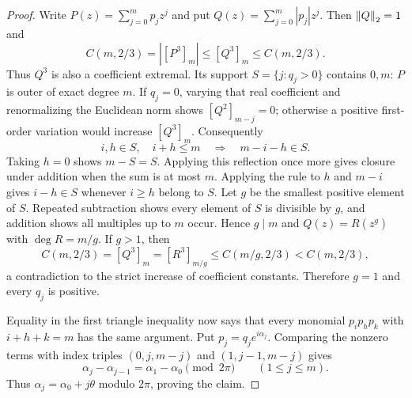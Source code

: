 \begin{proof}
Write $P(z)=\sum_{j=0}^m p_jz^j$ and put
$Q(z)=\sum_{j=0}^m|p_j|z^j$.  Then $\left\lVert Q\right\rVert_2=1$ and
\[
 C(m,2/3)=|[P^3]_m|\le[Q^3]_m\le C(m,2/3).
\]
Thus $Q^3$ is also a coefficient extremal.  Its support
$S=\{j:q_j>0\}$ contains $0,m$: $P$ is outer of exact degree $m$.
If $q_j=0$, varying that real coefficient and renormalizing the
Euclidean norm shows $[Q^2]_{m-j}=0$; otherwise a positive first-order
variation would increase $[Q^3]_m$.  Consequently
\[
 i,h\in S,\quad i+h\le m\quad\Longrightarrow\quad m-i-h\in S.
\]
Taking $h=0$ shows $m-S=S$.  Applying this reflection once more gives
closure under addition when the sum is at most $m$.  Applying the rule
to $h$ and $m-i$ gives $i-h\in S$ whenever $i\ge h$ belong to $S$.
Let $g$ be the smallest positive element of $S$.  Repeated subtraction
shows every element of $S$ is divisible by $g$, and addition shows all
multiples up to $m$ occur.  Hence $g\mid m$ and
$Q(z)=R(z^g)$ with $\deg R=m/g$.  If $g>1$, then
\[
 C(m,2/3)=[Q^3]_m=[R^3]_{m/g}
 \le C(m/g,2/3)<C(m,2/3),
\]
a contradiction to the strict increase of coefficient constants.
Therefore $g=1$ and every $q_j$ is positive.

Equality in the first triangle inequality now says that every monomial
$p_ip_hp_k$ with $i+h+k=m$ has the same argument.  Put
$p_j=q_je^{i\alpha_j}$.  Comparing the nonzero terms with index triples
$(0,j,m-j)$ and $(1,j-1,m-j)$ gives
\[
 \alpha_j-\alpha_{j-1}=\alpha_1-\alpha_0\pmod{2\pi}
 \qquad(1\le j\le m).
\]
Thus $\alpha_j=\alpha_0+j\theta$ modulo $2\pi$, proving the claim.
\end{proof}
